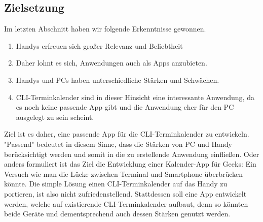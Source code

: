 \subsection{Zielsetzung}\label{section:zielsetzung}

Im letzten Abschnitt haben wir folgende Erkenntnisse gewonnen.
\begin{enumerate}
	\item Handys erfreuen sich großer Relevanz und Beliebtheit
	\item Daher lohnt es sich, Anwendungen auch als Apps anzubieten.
	\item Handys und PCs haben unterschiedliche Stärken und Schwächen.
	\item CLI-Terminkalender sind in dieser Hinsicht eine interessante Anwendung, da es noch keine passende App gibt und die Anwendung eher für den PC ausgelegt zu sein scheint.
\end{enumerate}

\myNewSection
Ziel ist es daher, eine passende App für die CLI-Terminkalender zu entwickeln. "Passend" bedeutet in diesem Sinne, dass die Stärken von PC und Handy berücksichtigt werden und somit in die zu erstellende Anwendung einfließen.\newline%
Oder anders formuliert ist das Ziel die \glqq Entwicklung einer Kalender-App für Geeks: Ein Versuch wie man die Lücke zwischen Terminal und Smartphone überbrücken könnte\grqq{}.\newline%
Die simple Lösung einen CLI-Terminkalender auf das Handy zu portieren, ist also nicht zufriedenstellend. Stattdessen soll eine App entwickelt werden, welche auf existierende CLI-Terminkalender aufbaut, denn so könnten beide Geräte und dementsprechend auch dessen Stärken genutzt werden.

